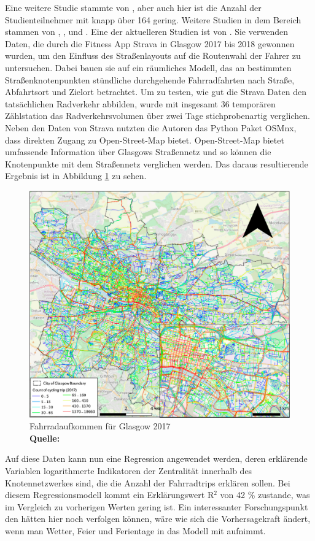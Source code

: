 \documentclass[a4paper,12pt]{thesis}
\newcommand*{\captionsource}[2]{%
	\caption[{#1}]{%
		#1%
		\\\hspace{\linewidth}%
		\textbf{Quelle:} #2%
	}%
}
\begin{document}
Eine weitere Studie stammte von \cite{Broach2012}, aber auch hier ist die Anzahl der Studienteilnehmer mit knapp über 164 gering. Weitere Studien in dem Bereich stammen von \cite{Musakwa2016}, \cite{Pritchard2018}, \cite{Lee2020} und \cite{Alattar2021}. Eine der aktuelleren Studien ist von \cite{Alattar2021}. Sie verwenden Daten, die durch die Fitness App Strava in Glasgow 2017 bis 2018 gewonnen wurden, um den Einfluss des Straßenlayouts auf die Routenwahl der Fahrer zu untersuchen. Dabei bauen sie auf ein räumliches Modell, das an bestimmten Straßenknotenpunkten stündliche durchgehende Fahrradfahrten nach Straße, Abfahrtsort und Zielort betrachtet. Um zu testen, wie gut die Strava Daten den tatsächlichen Radverkehr abbilden, wurde mit insgesamt 36 temporären Zählstation das Radverkehrsvolumen über zwei Tage stichprobenartig verglichen. Neben den Daten von Strava nutzten die Autoren das Python Paket OSMnx, dass direkten Zugang zu Open-Street-Map bietet. Open-Street-Map bietet umfassende Information über Glasgows Straßennetz und so können die Knotenpunkte mit dem Straßennetz verglichen werden. Das daraus resultierende Ergebnis ist in Abbildung \ref{Alattar_2021} zu sehen.
\begin{figure}[!ht]
	\centering
	\includegraphics[width=\textwidth]{Plots/Alattar2021.png}
	\captionsource{Fahrradaufkommen für Glasgow 2017}{
		\cite{Alattar2021}
	}
	\label{Alattar_2021}
\end{figure}
Auf diese Daten kann nun eine Regression angewendet werden, deren erklärende Variablen logarithmerte Indikatoren der Zentralität innerhalb des Knotennetzwerkes sind, die die Anzahl der Fahrradtrips erklären sollen. Bei diesem Regressionsmodell kommt ein Erklärungswert R$^2$ von 42 \% zustande, was im Vergleich zu vorherigen Werten gering ist. Ein interessanter Forschungspunkt den \cite{Alattar2021} hätten hier noch verfolgen können, wäre wie sich die Vorhersagekraft ändert, wenn man Wetter, Feier und Ferientage in das Modell mit aufnimmt.\\
\end{document}
